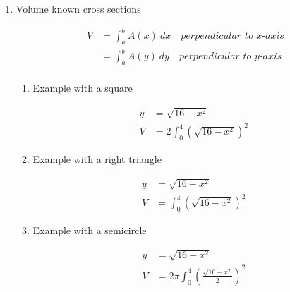 \documentclass[fleqn]{article}
\begin{document}
\begin{enumerate}
\begin {enumerate}
\end{enumerate}

\item Volume known cross sections

\begin{align*}
V &= \int_a^b A(x) \ dx \quad \textit{perpendicular to $x$-axis}\\
&= \int_a^b A(y) \ dy \quad \textit{perpendicular to $y$-axis}\\
\end{align*}
\begin {enumerate}

\item Example with a square

\begin{align*}
y &= \sqrt{16 - x^2}\\
V &= 2 \int _0^4 \left(\sqrt{16-x^2}\right)^2
\end{align*}

\item Example with a right triangle

\begin{align*}
y &= \sqrt{16 - x^2}\\
V &= \int _0^4 \left(\sqrt{16-x^2}\right)^2
\end{align*}

\item Example with a semicircle

\begin{align*}
y &= \sqrt{16 - x^2}\\
V &= 2 \pi \int _0^4 \left(\frac{\sqrt{16-x^2}}{2}\right)^2
\end{align*}

\end{enumerate}
\end{enumerate}
\end{document}
